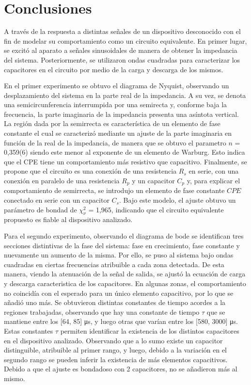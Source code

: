 \section{Conclusiones}
A través de la respuesta a distintas señales de un dispositivo desconocido con el fin de modelar su comportamiento como un circuito equivalente. En primer lugar, se excitó al aparato a señales sinusoidales de manera de obtener la impedancia del sistema. Posteriormente, se utilizaron ondas cuadradas para caracterizar los capacitores en el circuito por medio de la carga y descarga de los mismos. 

En el primer experimento se obtuvo el diagrama de Nyquist, observando un desplazamiento del sistema en la parte real de la impedancia. A su vez, se denota una semicircunferencia interrumpida por una semirecta y, conforme baja la frecuencia, la parte imaginaria de la impedancia presenta una asíntota vertical. La región dada por la semirrecta es característica de un elemento de fase constante el cual se caracterizó mediante un ajuste de la parte imaginaria en función de la real de la impedancia, de manera que se obtuvo el parametro $n$ = 0,359(6) siendo este menor al exponente de un elemento de Warburg. Esto indica que el CPE tiene un comportamiento más resistivo que capacitivo. Finalmente, se propone que el circuito es una conexión de una resistencia $R_s$ en serie, con una conexión en paralelo de una resistencia $R_p$ y un capacitor $C_p$ y, para explicar el comportamiento de semirrecta, se introdujo un elemento de fase constante $CPE$ conectado en serie con un capacitor $C_s$. Bajo este modelo, el ajuste obtuvo un parámetro de bondad de $\chi_{\nu}^2$ = 1,965, indicando que el circuito equivalente propuesto es fiable al dispositivo analizado. 

Para el segundo experimento, observando el diagrama de bode se identifican tres secciones distintivas de la fase del sistema: fase en crecimiento, fase constante y nuevamente un aumento de la misma. Por ello, se puso al sistema bajo ondas cuadradas en ciertas frecuencias atribuible a cada zona detectada. De esta manera, viendo la atenuación de la señal de salida, se ajustó la ecuación de carga y descarga caracteristica de los capacitores. En algunas zonas, el comportamiento no coincidía con el esperado para un único elemento capacitivo, por lo que se añadió uno más. Se obtuvieron distintas constantes de tiempo acordes a la regiones trabajadas, observando que hay una constante de tiempo $\tau$ que se mantiene entre los [64, 85] \si{\micro\second}, y luego otras que varían entre los [580, 3000] \si{\micro\second}. Estas constantes $\tau$ permiten identificar la existencia de los distintos capacitores en el dispositivo analizado. Observando que a lo sumo existe un capacitor distinguible, atribuible al primer rango, y luego, debido a la variación en el segundo rango se pueden inferir la existencia de más elementos capacitivos. Debido a que el ajuste es bondadoso con 2 capacitores, no se añadieron más al mismo. 

